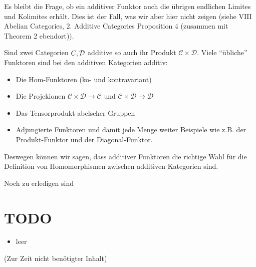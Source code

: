 \documentclass[a4paper]{amsart}
\theoremstyle{definition}
\newcommand{\C}{\ensuremath{\mathbb{ C }}}
\newcommand{\CC}{\ensuremath{\mathcal{ C }}}
\newcommand{\DD}{\ensuremath{\mathcal{ D }}}
\begin{document}
Es bleibt die Frage, ob ein additiver Funktor auch die übrigen endlichen Limites und Kolimites erhält. Dies ist der Fall, was wir aber hier nicht zeigen (siehe \cite{MacLane} VIII Abelian Categories, 2. Additive Categories Proposition 4 (zusammen mit Theorem 2 ebendort)).

Sind zwei Categorien $\\C, \DD$ additive so auch ihr Produkt $\CC \times \DD$. Viele "`übliche"' Funktoren sind bei den additiven Kategorien additiv:
\begin{itemize}
   \item Die Hom-Funktoren (ko- und kontravariant)
   \item Die Projekionen $\CC \times \DD \to \CC$ und $\CC \times \DD \to \DD$
   \item Das Tensorprodukt abelscher Gruppen
   \item Adjungierte Funktoren und damit jede Menge weiter Beispiele wie z.B. der Produkt-Funktor und der Diagonal-Funktor.
\end{itemize}

Deswegen können wir sagen, dass additiver Funktoren die richtige Wahl für die Definition von Homomorphismen zwischen additiven Kategorien sind.

\begin{backup}
Noch zu erledigen sind
\section{TODO}
\begin{itemize}
   \item leer
\end{itemize}
\end{backup}

\begin{backup}
    (Zur Zeit nicht benötigter Inhalt)
\end{backup}
\end{document}
